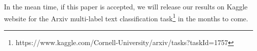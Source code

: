 \vspace{\baselineskip}

In the mean time, if this paper is accepted, we will release our results on Kaggle website for the Arxiv multi-label text classification task\footnote{https://www.kaggle.com/Cornell-University/arxiv/tasks?taskId=1757} in the months to come.




